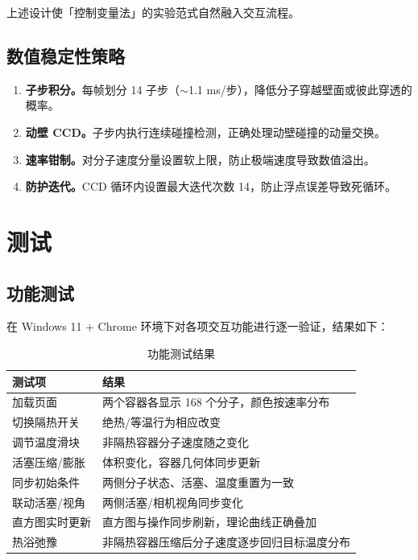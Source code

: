 \documentclass[zihao=-4,a4paper,oneside]{ctexbook}
\newcommand{\chapternb}[1]{%
  \bgroup
  \let\clearpage\relax
  \let\cleardoublepage\relax
  \chapter{#1}%
  \egroup
}
\newcommand{\tabhead}[1]{\textbf{#1}}
\begin{document}
上述设计使「控制变量法」的实验范式自然融入交互流程。

\section{数值稳定性策略}

\begin{enumerate}
  \item \textbf{子步积分。}每帧划分 14 子步（$\sim$1.1 ms/步），降低分子穿越壁面或彼此穿透的概率。
  \item \textbf{动壁 CCD。}子步内执行连续碰撞检测，正确处理动壁碰撞的动量交换。
  \item \textbf{速率钳制。}对分子速度分量设置软上限，防止极端速度导致数值溢出。
  \item \textbf{防护迭代。}CCD 循环内设置最大迭代次数 14，防止浮点误差导致死循环。
\end{enumerate}

\chapternb{测试}

\section{功能测试}

在 Windows 11 + Chrome 环境下对各项交互功能进行逐一验证，结果如下：

\begin{table}[htbp]
\centering
\caption{功能测试结果}
\begin{tabular}{p{5.0cm}p{7.0cm}}
\toprule
\tabhead{测试项} & \tabhead{结果} \\
\midrule
加载页面         & 两个容器各显示 168 个分子，颜色按速率分布 \\
切换隔热开关     & 绝热/等温行为相应改变 \\
调节温度滑块     & 非隔热容器分子速度随之变化 \\
活塞压缩/膨胀    & 体积变化，容器几何体同步更新 \\
同步初始条件     & 两侧分子状态、活塞、温度重置为一致 \\
联动活塞/视角    & 两侧活塞/相机视角同步变化 \\
直方图实时更新   & 直方图与操作同步刷新，理论曲线正确叠加 \\
热浴弛豫         & 非隔热容器压缩后分子速度逐步回归目标温度分布 \\
\bottomrule
\end{tabular}
\end{table}
\end{document}
